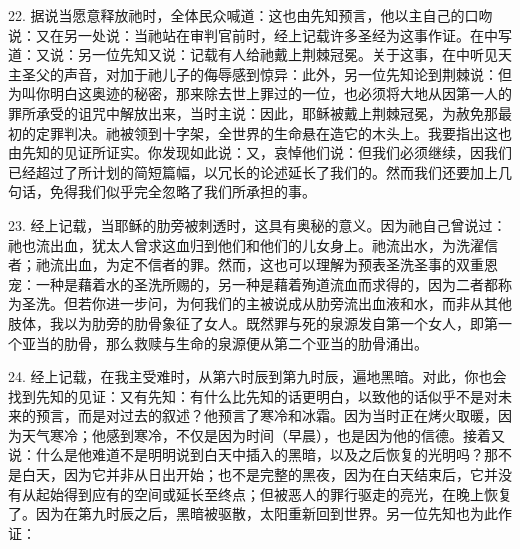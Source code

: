 22. 据说当愿意释放祂时，全体民众喊道：这也由先知预言，他以主自己的口吻说：又在另一处说：当祂站在审判官前时，经上记载许多圣经为这事作证。在中写道：又说：另一位先知又说：记载有人给祂戴上荆棘冠冕。关于这事，在中听见天主圣父的声音，对加于祂儿子的侮辱感到惊异：此外，另一位先知论到荆棘说：但为叫你明白这奥迹的秘密，那来除去世上罪过的一位，也必须将大地从因第一人的罪所承受的诅咒中解放出来，当时主说：因此，耶稣被戴上荆棘冠冕，为赦免那最初的定罪判决。祂被领到十字架，全世界的生命悬在造它的木头上。我要指出这也由先知的见证所证实。你发现如此说：又，哀悼他们说：但我们必须继续，因我们已经超过了所计划的简短篇幅，以冗长的论述延长了我们的。然而我们还要加上几句话，免得我们似乎完全忽略了我们所承担的事。\par

23. 经上记载，当耶稣的肋旁被刺透时，这具有奥秘的意义。因为祂自己曾说过：祂也流出血，犹太人曾求这血归到他们和他们的儿女身上。祂流出水，为洗濯信者；祂流出血，为定不信者的罪。然而，这也可以理解为预表圣洗圣事的双重恩宠：一种是藉着水的圣洗所赐的，另一种是藉着殉道流血而求得的，因为二者都称为圣洗。但若你进一步问，为何我们的主被说成从肋旁流出血液和水，而非从其他肢体，我以为肋旁的肋骨象征了女人。既然罪与死的泉源发自第一个女人，即第一个亚当的肋骨，那么救赎与生命的泉源便从第二个亚当的肋骨涌出。\par

24. 经上记载，在我主受难时，从第六时辰到第九时辰，遍地黑暗。对此，你也会找到先知的见证：又有先知：有什么比先知的话更明白，以致他的话似乎不是对未来的预言，而是对过去的叙述？他预言了寒冷和冰霜。因为当时正在烤火取暖，因为天气寒冷；他感到寒冷，不仅是因为时间（早晨），也是因为他的信德。接着又说：什么是他难道不是明明说到白天中插入的黑暗，以及之后恢复的光明吗？那不是白天，因为它并非从日出开始；也不是完整的黑夜，因为在白天结束后，它并没有从起始得到应有的空间或延长至终点；但被恶人的罪行驱走的亮光，在晚上恢复了。因为在第九时辰之后，黑暗被驱散，太阳重新回到世界。另一位先知也为此作证：\par

